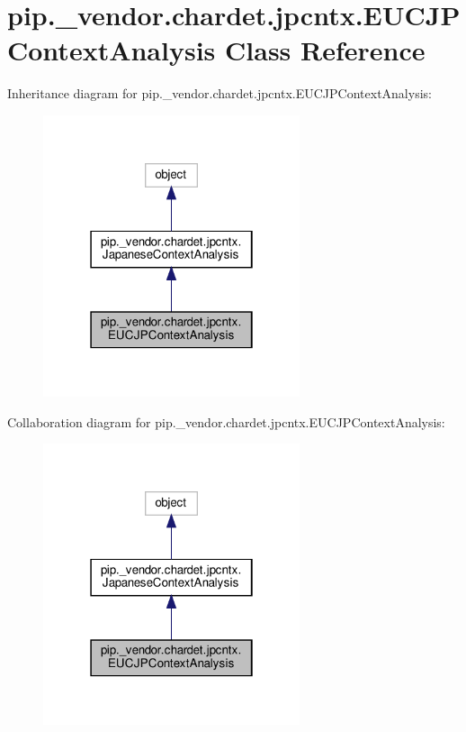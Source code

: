 \hypertarget{classpip_1_1__vendor_1_1chardet_1_1jpcntx_1_1EUCJPContextAnalysis}{}\section{pip.\+\_\+vendor.\+chardet.\+jpcntx.\+E\+U\+C\+J\+P\+Context\+Analysis Class Reference}
\label{classpip_1_1__vendor_1_1chardet_1_1jpcntx_1_1EUCJPContextAnalysis}


Inheritance diagram for pip.\+\_\+vendor.\+chardet.\+jpcntx.\+E\+U\+C\+J\+P\+Context\+Analysis\+:
\nopagebreak
\begin{figure}[H]
\begin{center}
\leavevmode
\includegraphics[width=214pt]{classpip_1_1__vendor_1_1chardet_1_1jpcntx_1_1EUCJPContextAnalysis__inherit__graph}
\end{center}
\end{figure}


Collaboration diagram for pip.\+\_\+vendor.\+chardet.\+jpcntx.\+E\+U\+C\+J\+P\+Context\+Analysis\+:
\nopagebreak
\begin{figure}[H]
\begin{center}
\leavevmode
\includegraphics[width=214pt]{classpip_1_1__vendor_1_1chardet_1_1jpcntx_1_1EUCJPContextAnalysis__coll__graph}
\end{center}
\end{figure}
